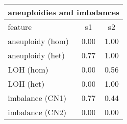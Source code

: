 \documentclass{standalone}
\begin{document}
\begin{tabular}{|l|c|c|}
\hline
\multicolumn{3}{|c|}{\textbf{aneuploidies and imbalances}}\\
\hline 

feature & s1 & s2 \\
\hline
aneuploidy (hom) & 0.00 & 1.00 \\
aneuploidy (het) & 0.77 & 1.00 \\
LOH (hom) & 0.00 & 0.56 \\
LOH (het) & 0.00 & 1.00 \\
imbalance (CN1) & 0.77 & 0.44 \\
imbalance (CN2) & 0.00 & 0.00 \\
\hline
\end{tabular}
\end{document}
